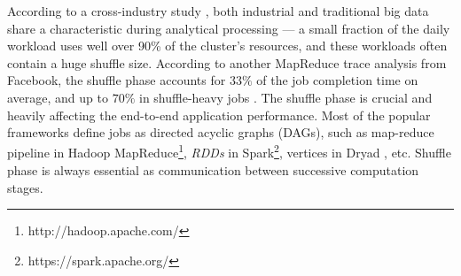 {\color{black}
According to a cross-industry study \cite{chen2012interactive}, both industrial and traditional big data share a characteristic during analytical processing --- a small fraction of the daily workload uses well over 90\% of the cluster’s resources, and these workloads often contain a huge shuffle size. 
According to another MapReduce trace analysis from Facebook, the shuffle phase accounts for $33\%$ of the job completion time on average, and up to $70\%$ in shuffle-heavy jobs \cite{managing}.
The shuffle phase is crucial and heavily affecting the end-to-end application performance.
Most of the popular frameworks define jobs as directed acyclic graphs (DAGs), such as map-reduce pipeline in Hadoop MapReduce\footnote{http://hadoop.apache.com/}, \textit{RDDs} in Spark\footnote{https://spark.apache.org/}, vertices in Dryad \cite{dryad}, etc.
Shuffle phase is always essential as communication between successive computation stages.
}

